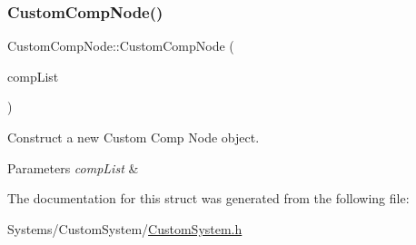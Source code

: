\subsubsection{\texorpdfstring{Custom\+Comp\+Node()}{CustomCompNode()}}
{\footnotesize\ttfamily Custom\+Comp\+Node\+::\+Custom\+Comp\+Node (\begin{DoxyParamCaption}\item[{std\+::vector$<$ \hyperlink{classCustomComponent}{Custom\+Component} $\ast$$>$ const \&}]{comp\+List }\end{DoxyParamCaption})\hspace{0.3cm}{\ttfamily [inline]}}



Construct a new Custom Comp Node object. 


\begin{DoxyParams}{Parameters}
{\em comp\+List} & \\
\hline
\end{DoxyParams}


The documentation for this struct was generated from the following file\+:\begin{DoxyCompactItemize}
\item 
Systems/\+Custom\+System/\hyperlink{CustomSystem_8h}{Custom\+System.\+h}\end{DoxyCompactItemize}
